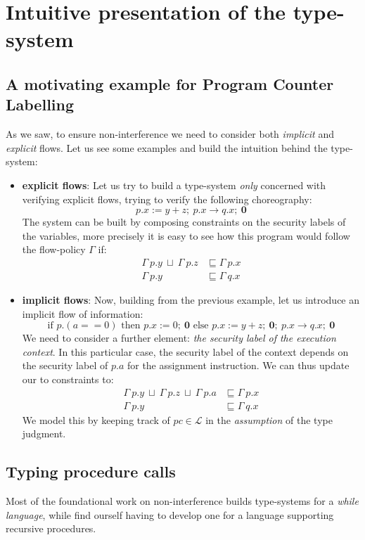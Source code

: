 \documentclass[12pt,a4paper,twoside]{book}
\begin{document}
\section{Intuitive presentation of the type-system}
\label{type:intuitive}
\subsection{A motivating example for Program Counter Labelling}
As we saw, to ensure non-interference we need to consider both \textit{implicit} and \textit{explicit} flows.
Let us see some examples and build the intuition behind the type-system:
\begin{itemize}
	\item{\textbf{explicit flows}}: Let us try to build a type-system \textit{only} concerned with verifying explicit flows, trying to verify the following choreography:
$$ p.x := y + z; ~ p.x \rightarrow q.x; ~ \boldsymbol{0} $$
	The system can be built by composing constraints on the security labels of the variables, more precisely it is easy to see how this program would follow the flow-policy $\Gamma$ if:
	\begin{align*}
		\Gamma~p.y ~\sqcup~ \Gamma~p.z &\sqsubseteq \Gamma~p.x\\
		\Gamma~p.y &\sqsubseteq \Gamma~q.x
	\end{align*}
	\item{\textbf{implicit flows}}: Now, building from the previous example, let us introduce an implicit flow of information:
	$$ \text{if } p.(a == 0) \text{ then } p.x := 0; ~ \boldsymbol{0} \text{ else } p.x := y + z; ~ \boldsymbol{0}; ~ p.x \rightarrow q.x; ~ \boldsymbol{0} $$
	We need to consider a further element: \textit{the security label of the execution context}. In this particular case, the security label of the context depends on the security label of $p.a$ for the assignment instruction. We can thus update our to constraints to:
	\begin{align*}
		\Gamma~p.y~\sqcup~\Gamma~p.z~\sqcup~\Gamma~p.a &\sqsubseteq \Gamma~p.x\\
		\Gamma~p.y &\sqsubseteq \Gamma~q.x
	\end{align*}
	We model this by keeping track of $pc \in \mathscr{L}$ in the \textit{assumption} of the type judgment.
\end{itemize}

\subsection{Typing procedure calls}
Most of the foundational work on non-interference\cite{sabelfeld2003language} builds type-systems for a \textit{while language}, while find ourself having to develop one for a language supporting recursive procedures.
\end{document}
